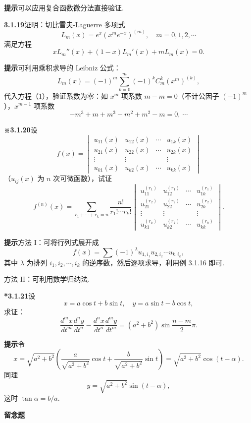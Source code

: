 \documentclass[UTF8, 12pt, fontset=fandol, oneside]{ctexart}
\begin{document}
\noindent\textbf{提示}\quad 可以应用复合函数微分法直接验证.

\noindent\textbf{3.1.19}\quad 证明：切比雪夫-Laguerre 多项式
\[
  L_m(x)=e^x(x^me^{-x})^{(m)},\quad m=0,1,2,\cdots
\]
满足方程
\begin{equation}
  xL_m''(x)+(1-x)L_m'(x)+mL_m(x)=0.
\tag{1}
\end{equation}

\noindent\textbf{提示}\quad 可利用乘积求导的 Leibniz 公式：
\[
  L_m(x)=(-1)^m\sum_{k=0}^{m}(-1)^k C_m^k(x^m)^{(k)},
\]
代入方程（1），验证系数为零：如 $x^m$ 项系数 $m-m=0$（不计公因子 $(-1)^m$），$x^{m-1}$ 项系数
\[
  -m^3+m+m^3-m^2+m^2-m=0,\ \cdots
\]

\noindent\textbf{※3.1.20}\quad 设
\[
  f(x)=
  \begin{vmatrix}
  u_{11}(x)&u_{12}(x)&\cdots&u_{1k}(x)\\
  u_{21}(x)&u_{22}(x)&\cdots&u_{2k}(x)\\
  \vdots&\vdots&&\vdots\\
  u_{k1}(x)&u_{k2}(x)&\cdots&u_{kk}(x)
  \end{vmatrix}
\]
（$u_{ij}(x)$ 为 $n$ 次可微函数），试证
\[
  f^{(n)}(x)=\sum_{r_1+\cdots+r_k=n}\frac{n!}{r_1!\cdots r_k!}
  \begin{vmatrix}
  u_{11}^{(r_1)}&u_{12}^{(r_1)}&\cdots&u_{1k}^{(r_1)}\\
  u_{21}^{(r_2)}&u_{22}^{(r_2)}&\cdots&u_{2k}^{(r_2)}\\
  \vdots&\vdots&&\vdots\\
  u_{k1}^{(r_k)}&u_{k2}^{(r_k)}&\cdots&u_{kk}^{(r_k)}
  \end{vmatrix}.
\]

\noindent\textbf{提示}\quad 方法 I：可将行列式展开成
\[
  f(x)=\sum(-1)^\lambda u_{1,i_1}u_{2,i_2}\cdots u_{k,i_k},
\]
其中 $\lambda$ 为排列 $i_1,i_2,\cdots,i_k$ 的逆序数，然后逐项求导，利用例 3.1.16 即可.

方法 II：可利用数学归纳法.

\noindent\textbf{*3.1.21}\quad 设
\[
  x=a\cos t+b\sin t,\quad y=a\sin t-b\cos t,
\]
求证：
\[
  \frac{d^m x}{dt^m}\frac{d^n y}{dt^n}
  -\frac{d^n x}{dt^n}\frac{d^m y}{dt^m}
  =(a^2+b^2)\sin\frac{n-m}{2}\pi.
\]

\noindent\textbf{提示}\quad 令
\[
  x=\sqrt{a^2+b^2}\left(\frac{a}{\sqrt{a^2+b^2}}\cos t+
  \frac{b}{\sqrt{a^2+b^2}}\sin t\right)
  =\sqrt{a^2+b^2}\cos(t-\alpha).
\]
同理
\[
  y=\sqrt{a^2+b^2}\sin(t-\alpha),
\]
这时 $\tan\alpha=b/a$.

\noindent\textbf{留念题}\quad
\end{document}
